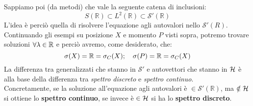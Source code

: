 \documentclass[../../FisicaTeorica.tex]{subfiles}
\begin{document}
Sappiamo poi (da metodi) che vale la seguente catena di inclusioni:
\begin{equation}
S\left(\mathbb{R}\right)\subset L^2\left(\mathbb{R}\right)\subset \mathcal{S}'\left(\mathbb{R}\right)
\label{eqn:triplettametodi}
\end{equation}
L'idea è perciò quella di risolvere l'equazione agli autovalori nello  $\mathcal{S}'(R)$. Continuando gli esempi su posizione $X$ e momento $P$ visti sopra, potremo trovare soluzioni $\forall \lambda \in \mathbb{R}$ e perciò avremo, come desiderato, che:
\[
\sigma(X) = \mathbb{R} = \sigma_C(X); \quad \sigma(P) = \mathbb{R} = \sigma_C(X)
\]
La differenza tra  generalizzati che stanno in $\mathcal{S}'$ e autovettori  che stanno in $\mathcal{H}$ è alla base della differenza tra \textit{spettro discreto} e \textit{spettro continuo}.\\
Concretamente, se la soluzione all'equazione agli autovalori è $\in \mathcal{S}'\left(\mathbb{R}\right)$, ma $\notin \mathcal{H}$ si ottiene lo \textbf{spettro continuo}, se invece è $\in \mathcal{H}$ si ha lo \textbf{spettro discreto}.\\
\end{document}
